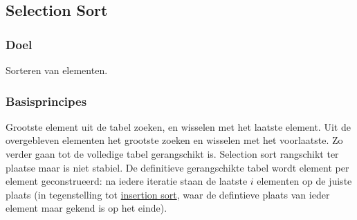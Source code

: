 \documentclass{article}
\begin{document}
\subsection{Selection Sort} %
\label{sub:selection_sort}
\subsubsection{Doel} %
\label{sub:sel_sort_doel}
Sorteren van elementen.

\subsubsection{Basisprincipes} %
\label{sub:sel_sort_basisprincipes}
Grootste element uit de tabel zoeken, en wisselen met het laatste element. Uit de overgebleven elementen het grootste zoeken en wisselen met het voorlaatste. Zo verder gaan tot de volledige tabel gerangschikt is. Selection sort rangschikt ter plaatse maar is niet stabiel. De definitieve gerangschikte tabel wordt element per element geconstrueerd: na iedere iteratie staan de laatste $i$ elementen op de juiste plaats (in tegenstelling tot \hyperref[sub:insertion_sort]{insertion sort}, waar de defintieve plaats van ieder element maar gekend is op het einde).
\end{document}
